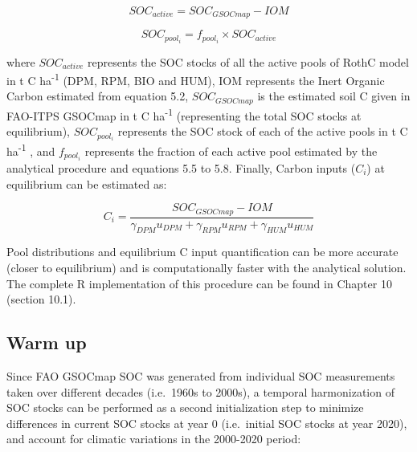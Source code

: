 \documentclass[
  10pt,
  b5paper,
]{book}
\begin{document}
\begin{equation}
\tag{5.10}
SOC_{active}=SOC_{GSOCmap} -IOM
\end{equation}

\begin{equation}
\tag{5.11}
SOC_{pool_i}=f_{pool_i} \times SOC_{active}
\end{equation}

where \(SOC_{active}\) represents the SOC stocks of all the active pools of RothC model in t C ha\textsuperscript{-1} (DPM, RPM, BIO and HUM), IOM represents the Inert Organic Carbon estimated from equation 5.2, \(SOC_{GSOCmap}\) is the estimated soil C given in FAO-ITPS GSOCmap in t C ha\textsuperscript{-1} (representing the total SOC stocks at equilibrium), \(SOC_{pool_i}\) represents the SOC stock of each of the active pools in t C ha\textsuperscript{-1} , and \(f_{pool_i}\) represents the fraction of each active pool estimated by the analytical procedure and equations 5.5 to 5.8.
Finally, Carbon inputs (\(C_i\)) at equilibrium can be estimated as:

\begin{equation}
\tag{5.12}
C_i= \frac{SOC_{GSOCmap}-IOM}{\gamma_{DPM}u_{DPM} + \gamma_{RPM} u_{RPM} + \gamma_{HUM} u_{HUM}}
\end{equation}

Pool distributions and equilibrium C input quantification can be more accurate (closer to equilibrium) and is computationally faster with the analytical solution. The complete R implementation of this procedure can be found in Chapter 10 (section 10.1).

\hypertarget{warm-up}{%
\subsection{Warm up}\label{warm-up}}

Since FAO GSOCmap SOC was generated from individual SOC measurements taken over different decades (i.e.~1960s to 2000s), a temporal harmonization of SOC stocks can be performed as a second initialization step to minimize differences in current SOC stocks at year 0 (i.e.~initial SOC stocks at year 2020), and account for climatic variations in the 2000-2020 period:
\end{document}
